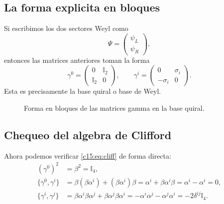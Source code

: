 \subsection{La forma explicita en bloques}
Si escribimos los dos sectores Weyl como
\begin{equation}
\Psi=
\begin{pmatrix}
\psi_L\\[0.3em]
\psi_R
\end{pmatrix},
\end{equation}
entonces las matrices anteriores toman la forma
\begin{equation}
\gamma^0=
\begin{pmatrix}
0 & \mathbb{I}_2\\
\mathbb{I}_2 & 0
\end{pmatrix},
\qquad
\gamma^i=
\begin{pmatrix}
0 & \sigma_i\\
-\sigma_i & 0
\end{pmatrix}.
\label{c15:eq:weylbasis}
\end{equation}
Esta es precisamente la base quiral o base de Weyl.

\begin{figure}[h!]
\centering
{}
\caption{Forma en bloques de las matrices gamma en la base quiral.}
\end{figure}

\subsection{Chequeo del algebra de Clifford}
Ahora podemos verificar \eqref{c15:eq:cliff} de forma directa:
\begin{align}
(\gamma^0)^2 &= \beta^2 = \mathbb{I}_4,\\
\{\gamma^0,\gamma^i\}
&=
\beta(\beta\alpha^i)+(\beta\alpha^i)\beta
=
\alpha^i+\beta\alpha^i\beta
=
\alpha^i-\alpha^i
=0,\\
\{\gamma^i,\gamma^j\}
&=
\beta\alpha^i\beta\alpha^j+\beta\alpha^j\beta\alpha^i
=
-\alpha^i\alpha^j-\alpha^j\alpha^i
=
-2\delta^{ij}\mathbb{I}_4.
\end{align}

